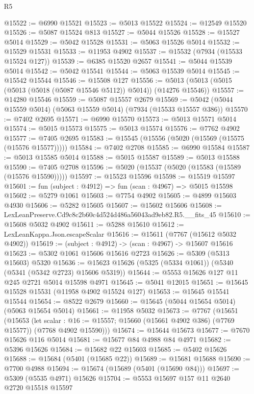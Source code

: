\begin{lexlean}{R5}
\begin{coremodule}
@15522 := @6990 @15521
@15523 := @5013 @15522
@15524 := @12549 @15520
@15526 := @5087 @15524 @813
@15527 := @5044 @15526
@15528 := @15527 @5014
@15529 := @5042 @15528
@15531 := @5063 @15526 @5014
@15532 := @15529 @15531
@15533 := @11953 @4902
@15537 := @15532 (@7934 (@15533 @15524 @127))
@15539 := @6385 @15520 @2657
@15541 := @5044 @15539 @5014
@15542 := @5042 @15541
@15544 := @5063 @15539 @5014
@15545 := @15542 @15544
@15546 := @15508 @127
@15556 := @5013 (@5013 (@5015 (@5013 (@5018 (@5087 @15546 @5112)) @5014)) (@14276 @15546))
@15557 := @14280 @15546
@15559 := @5087 @15557 @2679
@15569 := @5042 (@5044 @15559 @5014) (@5063 @15559 @5014) (@7934 (@15533 @15557 @386))
@15570 := @7402 @2695
@15571 := @6990 @15570
@15573 := @5013 @15571 @5014
@15574 := @5015 @15573
@15575 := @5013 @15574
@15576 := @7762 @4902
@15577 := @7405 @2695
@15583 := @15545 (@15556 (@5020 (@15569 (@15575 (@15576 @15577)))))
@15584 := @7402 @2708
@15585 := @6990 @15584
@15587 := @5013 @15585 @5014
@15588 := @5015 @15587
@15589 := @5013 @15588
@15590 := @7405 @2708
@15596 := @5020 (@15537 (@5020 (@15583 (@15589 (@15576 @15590)))))
@15597 := @15523 @15596
@15598 := @15519 @15597
@15601 := fun (subject : @4912) => fun (scan : @4967) => @5015 @15598
@15602 := @5279 @1061
@15603 := @7754 @4902
@15605 := @4899 @15603 @4930
@15606 := @5282 @15605
@15607 := @15602 @15606
@15608 := LexLeanPreserve.Cd9c8c2b60c4d524d486a56043ad9eb82.R5.__fits_45
@15610 := @15608 @5032 @4902
@15611 := @5288 @15610
@15612 := LexLeanKappa.Json.escapeScalar
@15616 := @15611 (@7767 (@15612 @5032 @4902))
@15619 := (subject : @4912) -> (scan : @4967) -> @15607 @15616
@15623 := @5302 @1061 @15606 @15616 @2723
@15626 := @5309 (@5313 @15603) @5320
@15636 := @15623 @15626 (@5325 (@5334 @1061)) (@5340 (@5341 (@5342 @2723) @15606 @5319))
@15644 := @5553 @15626 @127 @11 @245 @2721 @5014 @15598 @4971
@15645 := @5041 @12015
@15651 := @15645 @15528 @15531 (@11958 @4902 @15524 @127)
@15653 := @15645 @15541 @15544
@15654 := @8522 @2679
@15660 := @15645 (@5044 @15654 @5014) (@5063 @15654 @5014)
@15661 := @11958 @5032
@15673 := @7767
    (@15651
      (@15653
        (let scalar : @16 := @15557; @15660 (@15661 @4902 @386) (@7769 @15577))
        (@7768 @4902 @15590)))
@15674 := @15644 @15673
@15677 := @7670 @15626 @116 @5014
@15681 := @15677 @84 @4988 @84 @4971
@15682 := @5396 @15626
@15684 := @15682 @22 @15603
@15685 := @5402 @15626
@15688 := @15684 (@5401 (@15685 @22))
@15689 := @15681 @15688
@15690 := @7700 @4988
@15694 := @15674 (@15689 (@5401 (@15690 @84)))
@15697 := @5309 (@5535 @4971) @15626
@15704 := @5553 @15697 @157 @11 @2640 @2720 @15518 @15597

\end{coremodule}
\end{lexlean}
